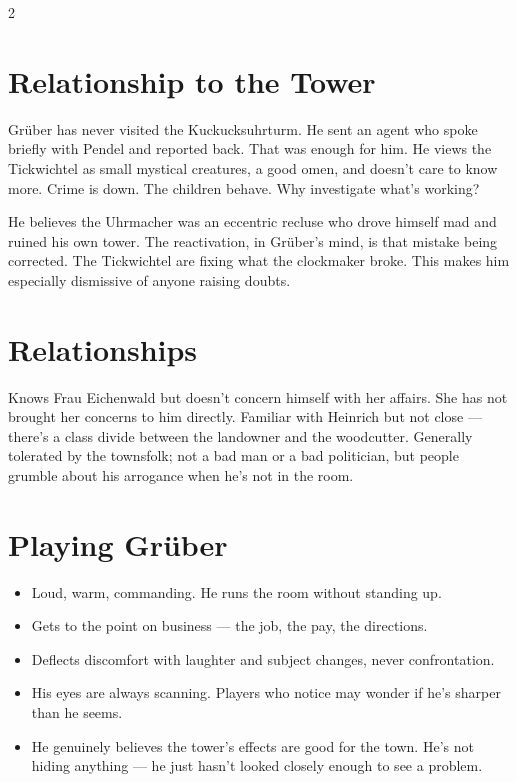 \documentclass[10pt,letterpaper]{article}
\begin{document}
\begin{multicols}{2}
\section*{Relationship to the Tower}
Grüber has never visited the Kuckucksuhrturm. He sent an agent who spoke briefly with Pendel and reported back. That was enough for him. He views the Tickwichtel as small mystical creatures, a good omen, and doesn't care to know more. Crime is down. The children behave. Why investigate what's working?

He believes the Uhrmacher was an eccentric recluse who drove himself mad and ruined his own tower. The reactivation, in Grüber's mind, is that mistake being corrected. The Tickwichtel are fixing what the clockmaker broke. This makes him especially dismissive of anyone raising doubts.

\section*{Relationships}
Knows Frau Eichenwald but doesn't concern himself with her affairs. She has not brought her concerns to him directly. Familiar with Heinrich but not close --- there's a class divide between the landowner and the woodcutter. Generally tolerated by the townsfolk; not a bad man or a bad politician, but people grumble about his arrogance when he's not in the room.

\section*{Playing Grüber}
\begin{itemize}
\item Loud, warm, commanding. He runs the room without standing up.
\item Gets to the point on business --- the job, the pay, the directions.
\item Deflects discomfort with laughter and subject changes, never confrontation.
\item His eyes are always scanning. Players who notice may wonder if he's sharper than he seems.
\item He genuinely believes the tower's effects are good for the town. He's not hiding anything --- he just hasn't looked closely enough to see a problem.
\end{itemize}

\end{multicols}

\newpage
\end{document}
